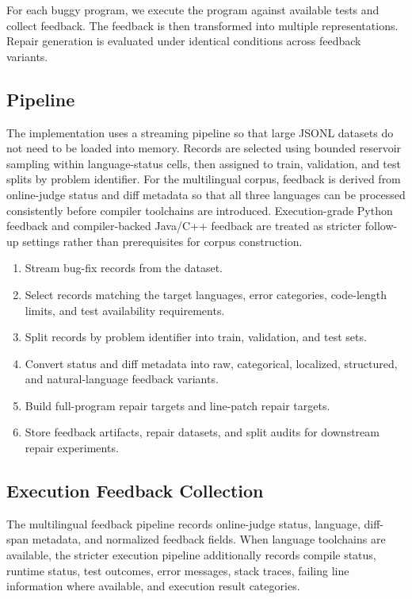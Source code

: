 \documentclass[conference]{IEEEtran}
\begin{document}
For each buggy program, we execute the program against available tests and collect feedback. The feedback is then transformed into multiple representations. Repair generation is evaluated under identical conditions across feedback variants.

\subsection{Pipeline}

The implementation uses a streaming pipeline so that large JSONL datasets do not need to be loaded into memory. Records are selected using bounded reservoir sampling within language-status cells, then assigned to train, validation, and test splits by problem identifier. For the multilingual corpus, feedback is derived from online-judge status and diff metadata so that all three languages can be processed consistently before compiler toolchains are introduced. Execution-grade Python feedback and compiler-backed Java/C++ feedback are treated as stricter follow-up settings rather than prerequisites for corpus construction.

\begin{enumerate}
    \item Stream bug-fix records from the dataset.
    \item Select records matching the target languages, error categories, code-length limits, and test availability requirements.
    \item Split records by problem identifier into train, validation, and test sets.
    \item Convert status and diff metadata into raw, categorical, localized, structured, and natural-language feedback variants.
    \item Build full-program repair targets and line-patch repair targets.
    \item Store feedback artifacts, repair datasets, and split audits for downstream repair experiments.
\end{enumerate}

\subsection{Execution Feedback Collection}

The multilingual feedback pipeline records online-judge status, language, diff-span metadata, and normalized feedback fields. When language toolchains are available, the stricter execution pipeline additionally records compile status, runtime status, test outcomes, error messages, stack traces, failing line information where available, and execution result categories.
\end{document}
